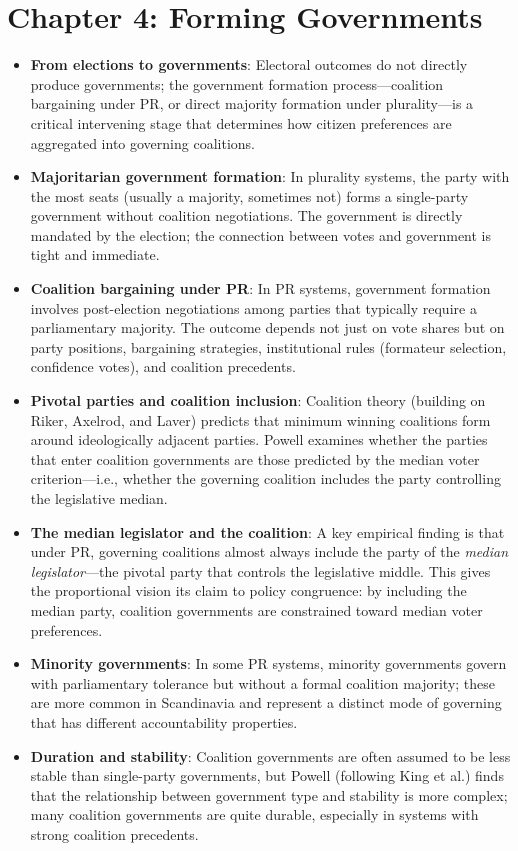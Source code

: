 \documentclass[12pt]{article}
\begin{document}
\section{Chapter 4: Forming Governments}

\begin{itemize}[leftmargin=*, itemsep=4pt]
    \item \textbf{From elections to governments}: Electoral outcomes do not directly produce governments; the government formation process---coalition bargaining under PR, or direct majority formation under plurality---is a critical intervening stage that determines how citizen preferences are aggregated into governing coalitions.
    \item \textbf{Majoritarian government formation}: In plurality systems, the party with the most seats (usually a majority, sometimes not) forms a single-party government without coalition negotiations. The government is directly mandated by the election; the connection between votes and government is tight and immediate.
    \item \textbf{Coalition bargaining under PR}: In PR systems, government formation involves post-election negotiations among parties that typically require a parliamentary majority. The outcome depends not just on vote shares but on party positions, bargaining strategies, institutional rules (formateur selection, confidence votes), and coalition precedents.
    \item \textbf{Pivotal parties and coalition inclusion}: Coalition theory (building on Riker, Axelrod, and Laver) predicts that minimum winning coalitions form around ideologically adjacent parties. Powell examines whether the parties that enter coalition governments are those predicted by the median voter criterion---i.e., whether the governing coalition includes the party controlling the legislative median.
    \item \textbf{The median legislator and the coalition}: A key empirical finding is that under PR, governing coalitions almost always include the party of the \emph{median legislator}---the pivotal party that controls the legislative middle. This gives the proportional vision its claim to policy congruence: by including the median party, coalition governments are constrained toward median voter preferences.
    \item \textbf{Minority governments}: In some PR systems, minority governments govern with parliamentary tolerance but without a formal coalition majority; these are more common in Scandinavia and represent a distinct mode of governing that has different accountability properties.
    \item \textbf{Duration and stability}: Coalition governments are often assumed to be less stable than single-party governments, but Powell (following King et al.) finds that the relationship between government type and stability is more complex; many coalition governments are quite durable, especially in systems with strong coalition precedents.
\end{itemize}
\end{document}

